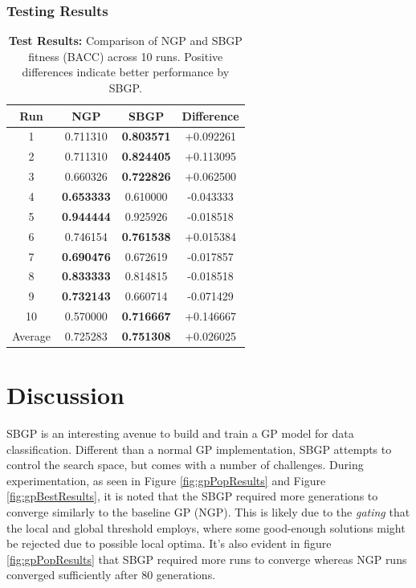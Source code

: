 \documentclass{article}
\begin{document}
\subsubsection{Testing Results}
\begin{table}[H]
\centering
\begin{tabular}{cccc}
\toprule
\textbf{Run} & \textbf{NGP} & \textbf{SBGP} & \textbf{Difference} \\
\midrule
1  & 0.711310 & \textbf{0.803571} & +0.092261 \\
2  & 0.711310 & \textbf{0.824405} & +0.113095 \\
3  & 0.660326 & \textbf{0.722826} & +0.062500 \\
4  & \textbf{0.653333} & 0.610000 & -0.043333 \\
5  & \textbf{0.944444} & 0.925926 & -0.018518 \\
6  & 0.746154 & \textbf{0.761538} & +0.015384 \\
7  & \textbf{0.690476} & 0.672619 & -0.017857 \\
8  & \textbf{0.833333} & 0.814815 & -0.018518 \\
9  & \textbf{0.732143} & 0.660714 & -0.071429 \\
10 & 0.570000 & \textbf{0.716667} & +0.146667 \\
\midrule
Average & 0.725283 & \textbf{0.751308} & +0.026025 \\
\bottomrule
\end{tabular}
\caption{\textbf{Test Results:} Comparison of NGP and SBGP fitness (BACC) across 10 runs. Positive differences indicate better performance by SBGP.}
\label{tab:bacc_comparison}
\end{table}

\section{Discussion}
\label{discussion}
SBGP is an interesting avenue to build and train a GP model for data classification. Different than a normal GP implementation, SBGP attempts to control the search space, but comes with a number of challenges. During experimentation, as seen in Figure \ref{fig:gpPopResults} and Figure \ref{fig:gpBestResults}, it is noted that the SBGP required more generations to converge similarly to the baseline GP (NGP). This is likely due to the \emph{gating} that the local and global threshold employs, where some good-enough solutions might be rejected due to possible local optima. It's also evident in figure \ref{fig:gpPopResults} that SBGP required more runs to converge whereas NGP runs converged sufficiently after 80 generations.
\end{document}
